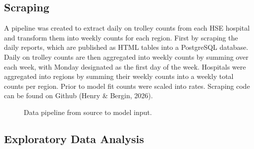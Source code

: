 \documentclass[
]{article}
\begin{document}
\subsection{\texorpdfstring{Scraping \label{sect:data-pipeline}}{Scraping }}\label{scraping}

A pipeline was created to extract daily on trolley counts from each HSE hospital and transform them into weekly counts for each region.
First by scraping the daily reports, which are published as HTML tables into a PostgreSQL database.
Daily on trolley counts are then aggregated into weekly counts by summing over each week, with Monday designated as the first day of the week.
Hospitals were aggregated into regions by summing their weekly counts into a weekly total counts per region.
Prior to model fit counts were scaled into rates. Scraping code can be found on Github (Henry \& Bergin, 2026).

\begin{figure}[h]
\centering
{}%
\caption{Data pipeline from source to model input.}
\label{fig:data-pipeline}
\end{figure}

\subsection{\texorpdfstring{Exploratory Data Analysis \label{sect:data-EDA}}{Exploratory Data Analysis }}\label{exploratory-data-analysis}
\end{document}
